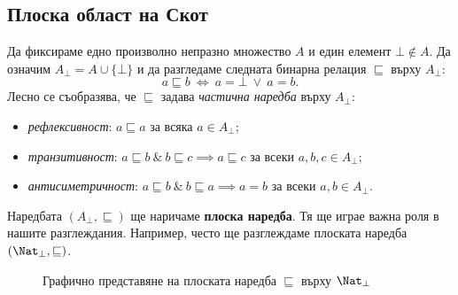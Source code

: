 \subsection{Плоска област на Скот}


Да фиксираме едно произволно непразно множество $A$ и един елемент $\bot \not \in A$.
Да означим $A_\bot = A \cup \{\bot\}$ и да разгледаме следната бинарна релация $\sqsubseteq$ върху $A_\bot$:
\[a \sqsubseteq b\ \iff\ a = \bot\ \vee\ a = b.\]
Лесно се съобразява, че $\sqsubseteq$ задава {\em частична наредба} върху $A_\bot$:
\begin{itemize}
\item 
  {\em рефлексивност}: $a \sqsubseteq a$ за всяка $a \in A_\bot$;
\item
  {\em транзитивност}: $a \sqsubseteq b\ \&\ b \sqsubseteq c \implies a\sqsubseteq c$ за всеки $a,b,c \in A_\bot$;
\item
  {\em антисиметричност}: $a \sqsubseteq b\ \&\ b\sqsubseteq a \implies a = b$ за всеки $a,b \in A_\bot$.
\end{itemize}

Наредбата $(A_\bot, \sqsubseteq)$ ще наричаме {\bf плоска наредба}. Тя ще играе важна роля в нашите разглеждания.
Например, често ще разглеждаме плоската наредба $(\Nat_\bot, \sqsubseteq)$.

\begin{framed}
  \begin{figure}[H]
    \label{fig:flat-nat-1}
    \centering
    \caption{Графично представяне на плоската наредба $\sqsubseteq$ върху $\Nat_\bot$}
  \end{figure}
  \end{framed}

